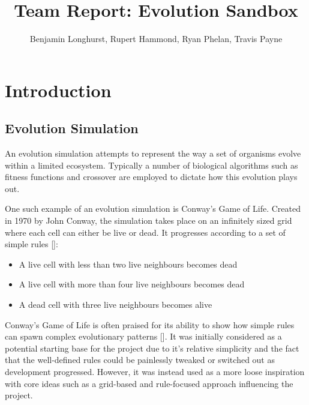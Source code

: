 \documentclass{ueacmpstyle}
\title{Team Report: Evolution Sandbox}
\author{Benjamin Longhurst, Rupert Hammond, Ryan Phelan, Travis Payne}
\begin{document}
	
\maketitle

\section{Introduction}
\subsection{Evolution Simulation}
An evolution simulation attempts to represent the way a set of organisms evolve within a limited ecosystem. Typically a number of biological algorithms such as fitness functions and crossover are employed to dictate how this evolution plays out. 

One such example of an evolution simulation is Conway's Game of Life. Created in 1970 by John Conway, the simulation takes place on an infinitely sized grid where each cell can either be live or dead. It progresses according to a set of simple rules [\cite{guardian}]:
\begin{itemize}
	\item A live cell with less than two live neighbours becomes dead
	\item A live cell with more than four live neighbours becomes dead
	\item A dead cell with three live neighbours becomes alive
\end{itemize}

Conway's Game of Life is often praised for its ability to show how simple rules can spawn complex evolutionary patterns [\cite{callahan}]. It was initially considered as a potential starting base for the project due to it's relative simplicity and the fact that the well-defined rules could be painlessly tweaked or switched out as development progressed. However, it was instead used as a more loose inspiration with core ideas such as a grid-based and rule-focused approach influencing the project.
\end{document}
